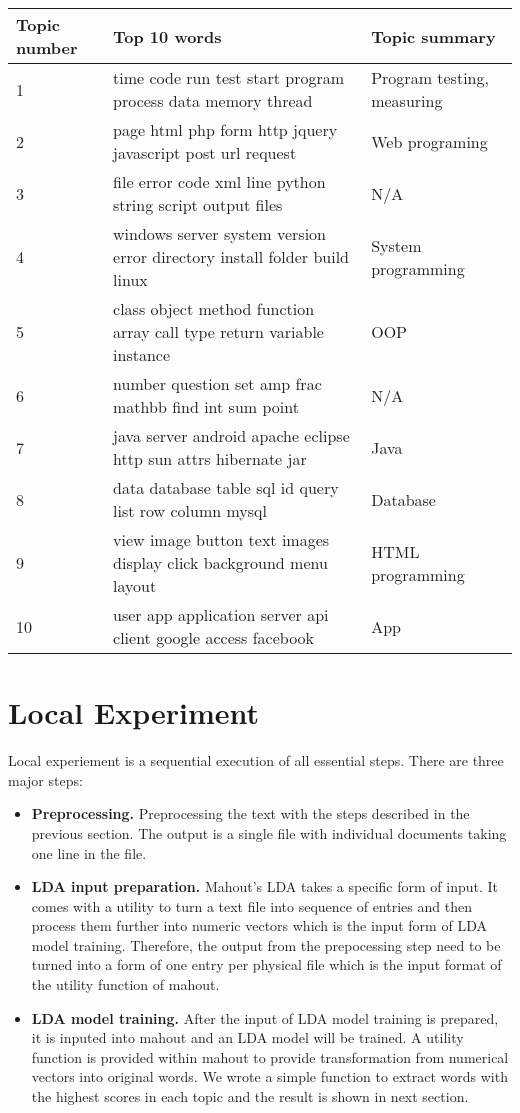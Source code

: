 \documentclass{article}
\begin{document}
\begin{center}
  \begin{tabular}{| l | l | l |}
    \hline
    Topic number & Top 10 words & Topic summary \\ \hline
    1 & time code run test start program process data memory thread & Program testing, measuring \\ \hline
    2 & page html php form http jquery javascript post url request & Web programing \\ \hline
    3 & file error code xml line python string script output files  & N/A \\ \hline
    4 & windows server system version error directory install folder build linux & System programming \\ \hline
    5 & class object method function array call type return variable instance & OOP \\ \hline
    6 & number question set amp frac mathbb find int sum point & N/A \\ \hline
    7 & java server android apache eclipse http sun attrs hibernate jar & Java \\ \hline
    8 & data database table sql id query list row column mysql & Database \\ \hline
    9 & view image button text images display click background menu layout & HTML programming \\ \hline
    10 & user app application server api client google access facebook & App \\
    \hline
  \end{tabular}
\end{center}


\section{Local Experiment}

Local experiement is a sequential execution of all essential steps. There are three major steps:

\begin{itemize}
	\item \textbf{Preprocessing.} Preprocessing the text with the steps described in the previous section. The output is a single file with individual documents taking one line in the file.
	\item \textbf{LDA input preparation.} Mahout's LDA takes a specific form of input. It comes with a utility to turn a text file into sequence of entries and then process them further into numeric vectors which is the input form of LDA model training. Therefore, the output from the prepocessing step need to be turned into a form of one entry per physical file which is the input format of the utility function of mahout.
	\item \textbf{LDA model training.} After the input of LDA model training is prepared, it is inputed into mahout and an LDA model will be trained. A utility function is provided within mahout to provide transformation from numerical vectors into original words. We wrote a simple function to extract words with the highest scores in each topic and the result is shown in next section.
\end{itemize}
\end{document}
